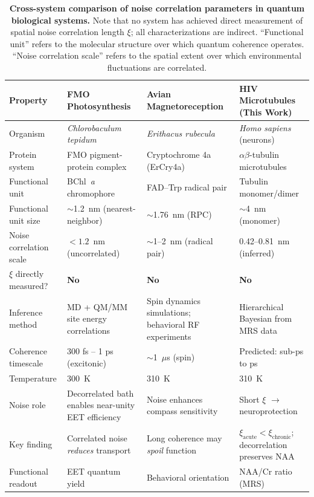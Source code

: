 \documentclass[11pt]{article}
\begin{document}
\begin{table}[H]
\centering
\caption{\textbf{Cross-system comparison of noise correlation parameters in quantum biological 
systems.} Note that no system has achieved direct measurement of spatial noise correlation 
length $\xi$; all characterizations are indirect. ``Functional unit'' refers to the molecular 
structure over which quantum coherence operates. ``Noise correlation scale'' refers to the 
spatial extent over which environmental fluctuations are correlated.}
\label{tab:cross_system}
\small
\begin{tabular}{p{2.8cm}p{3.5cm}p{3.5cm}p{3.5cm}}
\toprule
\textbf{Property} & \textbf{FMO Photosynthesis} & \textbf{Avian Magnetoreception} & \textbf{HIV Microtubules (This Work)} \\
\midrule
Organism & \textit{Chlorobaculum tepidum} & \textit{Erithacus rubecula} & \textit{Homo sapiens} (neurons) \\
Protein system & FMO pigment-protein complex & Cryptochrome 4a (ErCry4a) & $\alpha\beta$-tubulin microtubules \\
Functional unit & BChl~\textit{a} chromophore & FAD--Trp radical pair & Tubulin monomer/dimer \\
Functional unit size & $\sim$1.2~nm (nearest-neighbor) & $\sim$1.76~nm (RPC) & $\sim$4~nm (monomer) \\
Noise correlation scale & $< 1.2$~nm (uncorrelated) & $\sim$1--2~nm (radical pair) & 0.42--0.81~nm (inferred) \\
$\xi$ directly measured? & \textbf{No} & \textbf{No} & \textbf{No} \\
Inference method & MD + QM/MM site energy correlations & Spin dynamics simulations; behavioral RF experiments & Hierarchical Bayesian from MRS data \\
Coherence timescale & 300 fs -- 1 ps (excitonic) & $\sim$1~$\mu$s (spin) & Predicted: sub-ps to ps \\
Temperature & 300~K & 310~K & 310~K \\
Noise role & Decorrelated bath enables near-unity EET efficiency & Noise enhances compass sensitivity & Short $\xi$ $\to$ neuroprotection \\
Key finding & Correlated noise \textit{reduces} transport & Long coherence may \textit{spoil} function & $\xi_\text{acute} < \xi_\text{chronic}$; decorrelation preserves NAA \\
Functional readout & EET quantum yield & Behavioral orientation & NAA/Cr ratio (MRS) \\
\bottomrule
\end{tabular}
\end{table}
\FloatBarrier
\end{document}
